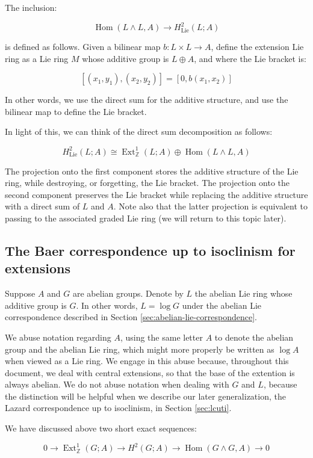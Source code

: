 \documentclass{ucetd}
\begin{document}
The inclusion:

$$\operatorname{Hom}(L \wedge L,A) \to H^2_{\text{Lie}}(L;A)$$

is defined as follows. Given a bilinear map $b:L \times L \to A$,
define the extension Lie ring as a Lie ring $M$ whose additive group
is $L \oplus A$, and where the Lie bracket is:

$$[(x_1,y_1),(x_2,y_2)] = [0,b(x_1,x_2)]$$

In other words, we use the direct sum for the additive structure, and
use the bilinear map to define the Lie bracket.

In light of this, we can think of the direct sum decomposition as follows:

$$H^2_{\text{Lie}}(L;A) \cong \operatorname{Ext}^1_{\mathbb{Z}}(L;A) \oplus \operatorname{Hom}(L \wedge L,A)$$

The projection onto the first component stores the additive structure
of the Lie ring, while destroying, or forgetting, the Lie bracket. The
projection onto the second component preserves the Lie bracket while
replacing the additive structure with a direct sum of $L$ and
$A$. Note also that the latter projection is equivalent to passing to
the associated graded Lie ring (we will return to this topic later).

\subsection{The Baer correspondence up to isoclinism for extensions}\label{sec:bcuti-extensions}

Suppose $A$ and $G$ are abelian groups. Denote by $L$ the abelian Lie
ring whose additive group is $G$. In other words, $L = \log G$ under
the abelian Lie correspondence described in Section
\ref{sec:abelian-lie-correspondence}.

We abuse notation regarding $A$, using the same letter $A$ to denote
the abelian group and the abelian Lie ring, which might more properly
be written as $\log A$ when viewed as a Lie ring. We engage in this
abuse because, throughout this document, we deal with central
extensions, so that the base of the extention is always abelian. We do
not abuse notation when dealing with $G$ and $L$, because the
distinction will be helpful when we describe our later generalization,
the Lazard correspondence up to isoclinism, in Section
\ref{sec:lcuti}.

We have discussed above two short exact sequences:

\begin{equation*}
  0 \to \operatorname{Ext}^1_{\mathbb{Z}}(G;A) \to H^2(G;A) \to \operatorname{Hom}(G \wedge G,A) \to 0
\end{equation*}
\end{document}
